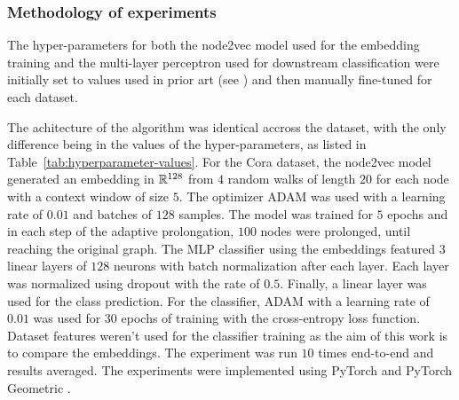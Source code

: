 \documentclass[sn-mathphys,pdflatex,iicol]{sn-jnl}%
\newcommand{\mathfield}{\ensuremath{\mathbb}}
\begin{document}
\subsubsection{Methodology of experiments}

The hyper-parameters for both the node2vec model used for the embedding training and the multi-layer perceptron used for downstream classification were initially set to values used in prior art (see \cite{hu_open_2021, fey_fast_2019}) and then manually fine-tuned for each dataset.

The achitecture of the algorithm was identical accross the dataset, with the only difference being in the values of the hyper-parameters, as listed in Table~\ref{tab:hyperparameter-values}. For the Cora dataset, the node2vec model generated an embedding in \( \mathfield{R}^{128} \) from \( 4 \) random walks of length \( 20 \) for each node with a context window of size \( 5 \). The optimizer ADAM \cite{kingma_adam:_2017} was used with a learning rate of \( 0.01 \) and batches of \( 128 \) samples. The model was trained for \( 5 \) epochs and in each step of the adaptive prolongation, \( 100 \) nodes were prolonged, until reaching the original graph. The MLP classifier using the embeddings featured \( 3 \) linear layers of \( 128 \) neurons with batch normalization after each layer. Each layer was normalized using dropout \cite{srivastava_dropout_2014} with the rate of \( 0.5 \). Finally, a linear layer was used for the class prediction. For the classifier, ADAM with a learning rate of \( 0.01 \) was used for \( 30 \) epochs of training with the cross-entropy loss function. Dataset features weren't used for the classifier training as the aim of this work is to compare the embeddings. The experiment was run \( 10 \) times end-to-end and results averaged. The experiments were implemented using PyTorch \cite{paszke_pytorch_2019} and PyTorch Geometric \cite{fey_fast_2019}.
\end{document}
